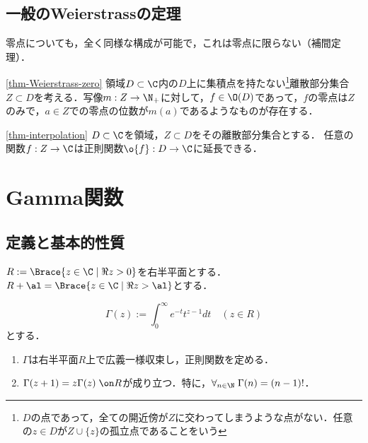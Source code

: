 \documentclass[uplatex, dvipdfmx]{jsreport}
\begin{document}
\subsection{一般のWeierstrassの定理}

\begin{tcolorbox}[colframe=ForestGreen, colback=ForestGreen!10!white,breakable,colbacktitle=ForestGreen!40!white,coltitle=black,fonttitle=\bfseries\sffamily,
title=]
    零点についても，全く同様な構成が可能で，これは零点に限らない（補間定理）．
\end{tcolorbox}

\begin{theorem}[Weierstrass]\ref{thm-Weierstrass-zero}
    領域$D\subset\C$内の$D$上に集積点を持たない\footnote{$D$の点であって，全ての開近傍が$Z$に交わってしまうような点がない．任意の$z\in D$が$Z\cup\{z\}$の孤立点であることをいう}離散部分集合$Z\subset D$を考える．写像$m:Z\to\N_+$に対して，$f\in\O(D)$であって，$f$の零点は$Z$のみで，$a\in Z$での零点の位数が$m(a)$であるようなものが存在する．
\end{theorem}

\begin{corollary}[補間定理]\ref{thm-interpolation}
    $D\subset\C$を領域，$Z\subset D$をその離散部分集合とする．
    任意の関数$f:Z\to\C$は正則関数$\o{f}:D\to\C$に延長できる．
\end{corollary}

\section{Gamma関数}

\subsection{定義と基本的性質}

\begin{notation}
    $R:=\Brace{z\in\C\mid\Re z>0}$を右半平面とする．$R+\al=\Brace{z\in\C\mid\Re z>\al}$とする．
\end{notation}

\begin{proposition}
    \[\Gamma(z):=\int^\infty_0e^{-t}t^{z-1}dt\quad(z\in R)\]
    とする．
    \begin{enumerate}
        \item $\Gamma$は右半平面$R$上で広義一様収束し，正則関数を定める．
        \item $\Gamma(z+1)=z\Gamma(z)\;\on R$が成り立つ．特に，$\forall_{n\in\N}\;\Gamma(n)=(n-1)!$．
    \end{enumerate}
\end{proposition}
\end{document}
